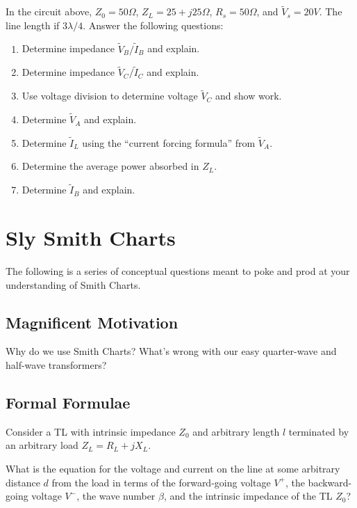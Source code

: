 \documentclass{article}
\begin{document}
In the circuit above, $Z_0 = 50 \Omega$, $Z_L = 25 + j25 \Omega$, $R_s = 50 \Omega$, and $\tilde{V}_s = 20 V$. The line length if $3 \lambda / 4$. Answer the following questions:

\begin{enumerate}
    \item Determine impedance $\tilde{V}_B/\tilde{I}_B$ and explain. \vfill
    \item Determine impedance $\tilde{V}_C/\tilde{I}_C$ and explain. \vfill
    \item Use voltage division to determine voltage $\tilde{V}_C$ and show work. \vfill
    \item Determine $\tilde{V}_A$ and explain. \vfill
    \item Determine $\tilde{I}_L$ using the ``current forcing formula'' from $\tilde{V}_A$. \vfill
    \item Determine the average power absorbed in $Z_L$. \vfill
    \item Determine $\tilde{I}_B$ and explain. \vfill
\end{enumerate}

\newpage

\section{Sly Smith Charts}
\label{section:smith_chart}

The following is a series of conceptual questions meant to poke and prod at your understanding of Smith Charts.

\subsection{Magnificent Motivation}

Why do we use Smith Charts? What's wrong with our easy quarter-wave and half-wave transformers?

\vspace{3cm}

\subsection{Formal Formulae}
\label{section:formal_formulae}

Consider a TL with intrinsic impedance $Z_0$ and arbitrary length $l$ terminated by an arbitrary load $Z_L = R_L + jX_L$.

What is the equation for the voltage and current on the line at some arbitrary distance $d$ from the load in terms of the forward-going voltage $V^+$, the backward-going voltage $V^-$, the wave number $\beta$, and the intrinsic impedance of the TL $Z_0$?
\end{document}
